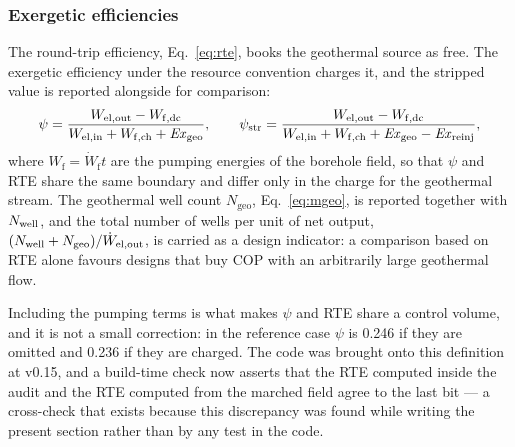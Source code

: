 \subsubsection{Exergetic efficiencies}

The round-trip efficiency, Eq.~\eqref{eq:rte}, books the geothermal source as
free. The exergetic efficiency under the resource convention charges it, and
the stripped value is reported alongside for comparison:
\begin{equation}
  \psi=\frac{W_\mathrm{el,out}-W_\mathrm{f,dc}}
            {W_\mathrm{el,in}+W_\mathrm{f,ch}+\mathit{Ex}_\mathrm{geo}},
  \qquad
  \psi_\mathrm{str}=\frac{W_\mathrm{el,out}-W_\mathrm{f,dc}}
            {W_\mathrm{el,in}+W_\mathrm{f,ch}+\mathit{Ex}_\mathrm{geo}-\mathit{Ex}_\mathrm{reinj}},
  \label{eq:psi}
\end{equation}
where $W_\mathrm{f}=\dot W_\mathrm{f}t$ are the pumping energies of the
borehole field, so that $\psi$ and RTE share the same boundary and differ only
in the charge for the geothermal stream. The geothermal well count
$N_\mathrm{geo}$, Eq.~\eqref{eq:mgeo}, is reported together with $N_{\mathrm{well}}$, and the
total number of wells per unit of net output,
$(N_{\mathrm{well}}+N_\mathrm{geo})/\dot W_\mathrm{el,out}$, is carried as a design indicator:
a comparison based on RTE alone favours designs that buy COP with an
arbitrarily large geothermal flow.

Including the pumping terms is what makes $\psi$ and RTE share a control
volume, and it is not a small correction: in the reference case $\psi$ is
\num{0.246} if they are omitted and \num{0.236} if they are charged. The code
was brought onto this definition at v0.15, and a build-time check now asserts
that the RTE computed inside the audit and the RTE computed from the marched
field agree to the last bit --- a cross-check that exists because this
discrepancy was found while writing the present section rather than by any
test in the code.
